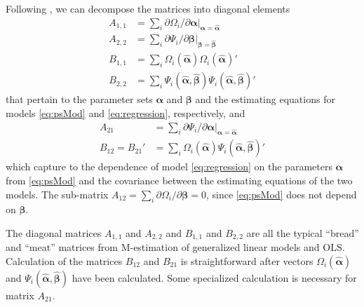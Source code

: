 \documentclass{statsoc} %
\begin{document}
Following \citet[][p. 373]{carroll2006measurement}, we %
can decompose the matrices into diagonal elements 
\begin{equation*}
    \begin{split}
        A_{1,1}&=\sum_i \partial \Omega_i/\partial \bm{\alpha}|_{\bm{\alpha}=\bm{\hat{\alpha}}}\\
        A_{2,2}&=\sum_i\partial\Psi_i/\partial \bm{\beta}|_{\bm{\beta}=\bm{\hat{\beta}}}\\
        B_{1,1}&=\sum_i\Omega_i(\bm{\hat\alpha})\Omega_i(\bm{\hat\alpha})'\\
        B_{2,2}&=\sum_i \Psi_i(\bm{\hat\alpha},\bm{\hat\beta})\Psi_i(\bm{\hat\alpha},\bm{\hat\beta})'
    \end{split}
\end{equation*}
 that pertain to the parameter sets $\bm{\alpha}$ and $\bm{\beta}$ and the estimating equations for models \eqref{eq:psMod} and  \eqref{eq:regression}, respectively, and 
 \begin{equation*}
     \begin{split}
         A_{21}&=\sum_i\partial\Psi_i/\partial \bm{\alpha}|_{\bm{\alpha}=\bm{\hat{\alpha}}}\\
         B_{12}=B_{21}'&=\sum_i \Omega_i(\bm{\hat{\alpha}})\Psi_i(\bm{\hat{\alpha}},\bm{\hat{\beta}})'
     \end{split}
 \end{equation*}
 which capture to the dependence of model \eqref{eq:regression} on the parameters $\bm{\alpha}$ from \eqref{eq:psMod} and the covariance between the estimating equations of the two models. 
The sub-matrix $A_{12}=\sum_i \partial \Omega_i/\partial \bm{\beta}=0$, since \eqref{eq:psMod} does not depend on $\bm{\beta}$.

The diagonal matrices $A_{1,1}$ and $A_{2,2}$ and $B_{1,1}$ and $B_{2,2}$ are all the typical ``bread'' and ``meat'' matrices from M-estimation of generalized linear models and OLS. 
Calculation of the matrices $B_{12}$ and $B_{21}$ is straightforward after vectors $\Omega_i(\bm{\hat{\alpha}})$ and $\Psi_i(\bm{\hat{\alpha}},\bm{\hat{\beta}})$ have been calculated.
Some specialized calculation is necessary for matrix $A_{21}$. 
\end{document}
